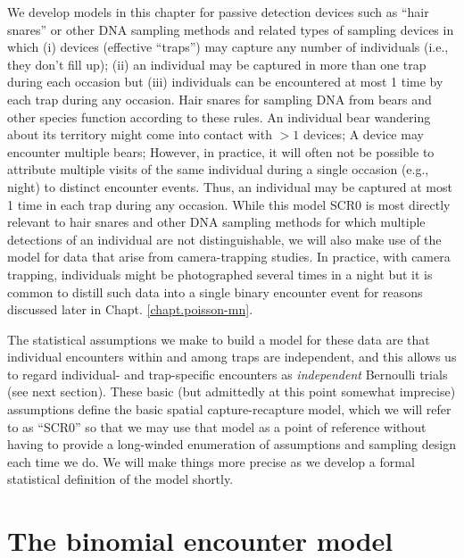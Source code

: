 We develop models in this chapter for passive detection
devices such as ``hair snares''
or other DNA sampling methods \citep{kery_etal:2010,
  gardner_etal:2010jwm} and related types of sampling devices in which
(i) devices (effective ``traps'') may capture any number of individuals (i.e.,
they don't fill up);
%
%
(ii) an individual may be
captured in more than one trap during each occasion but (iii)
individuals can be encountered at most 1 time by each trap during any
occasion.  Hair snares for sampling DNA from bears and other species
function according to these rules. An individual bear wandering about
its territory might come into contact with  $>1$ devices; A device may
encounter multiple bears; However, in practice, it will often not be
possible to attribute multiple visits of the same individual during a
single occasion (e.g., night) to
distinct encounter events. Thus, an individual may be captured at most
1 time in each trap during any occasion.
While this model SCR0  is most directly relevant
to hair snares and other DNA sampling methods for which multiple
detections of an individual are not distinguishable,
we will also make use of the model for data that arise from
camera-trapping studies. In practice, with camera trapping,
individuals might be photographed several times in a night but it is
common to
 distill such data into a single binary encounter event for
reasons discussed later in Chapt. \ref{chapt.poisson-mn}.

The statistical assumptions we make to build a model for these data
are that individual encounters
within and among traps are independent, and this allows us to regard
individual- and trap-specific encounters as {\it independent} Bernoulli trials
(see next section).  These basic (but admittedly at this point
somewhat imprecise) assumptions define the basic spatial
capture-recapture model, which we will refer to as ``SCR0''
so that we may use that model as a point of reference without having
to provide a long-winded enumeration of assumptions and sampling
design each time we do. We will make things more precise as we develop
a formal statistical definition of the model shortly.


\section{The binomial encounter model}

